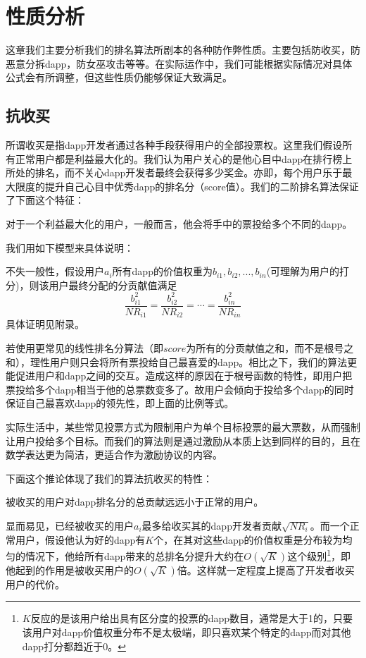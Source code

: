 \section{性质分析}
这章我们主要分析我们的排名算法所剧本的各种防作弊性质。主要包括防收买，防恶意分拆dapp，防女巫攻击等等。在实际运作中，我们可能根据实际情况对具体公式会有所调整，但这些性质仍能够保证大致满足。

\subsection{抗收买}
所谓收买是指dapp开发者通过各种手段获得用户的全部投票权。这里我们假设所有正常用户都是利益最大化的。我们认为用户关心的是他心目中dapp在排行榜上所处的排名，而不关心dapp开发者最终会获得多少奖金。亦即，每个用户乐于最大限度的提升自己心目中优秀dapp的排名分（score值）。我们的二阶排名算法保证了下面这个特征：

\begin{property}
	\label{p1}
	对于一个利益最大化的用户，一般而言，他会将手中的票投给多个不同的dapp。
\end{property}
我们用如下模型来具体说明：

不失一般性，假设用户$a_i$所有dapp的价值权重为$b_{i1},b_{i2},...,b_{in}$(可理解为用户的打分)，则该用户最终分配的分贡献值满足
$$\frac{b_{i1}^2}{NR_{i1}}=\frac{b_{i2}^2}{NR_{i2}}=\cdots=\frac{b_{in}^2}{NR_{in}}$$
具体证明见附录。

若使用更常见的线性排名分算法（即$score$为所有的分贡献值之和，而不是根号之和），理性用户则只会将所有票投给自己最喜爱的dapp。相比之下，我们的算法更能促进用户和dapp之间的交互。造成这样的原因在于根号函数的特性，即用户把票投给多个dapp相当于他的总票数变多了。故用户会倾向于投给多个dapp的同时保证自己最喜欢dapp的领先性，即上面的比例等式。

实际生活中，某些常见投票方式为限制用户为单个目标投票的最大票数，从而强制让用户投给多个目标。而我们的算法则是通过激励从本质上达到同样的目的，且在数学表达更为简洁，更适合作为激励协议的内容。

下面这个推论体现了我们的算法抗收买的特性：
\begin{corollary}
被收买的用户对dapp排名分的总贡献远远小于正常的用户。
\end{corollary}
显而易见，已经被收买的用户$a_i$最多给收买其的dapp开发者贡献$\sqrt{NR_i}$。而一个正常用户，假设他认为好的dapp有$K$个，在其对这些dapp的价值权重是分布较为均匀的情况下，他给所有dapp带来的总排名分提升大约在$O(\sqrt{K})$这个级别\footnote{$K$反应的是该用户给出具有区分度的投票的dapp数目，通常是大于1的，只要该用户对dapp价值权重分布不是太极端，即只喜欢某个特定的dapp而对其他dapp打分都趋近于0。}，即他起到的作用是被收买用户的$O(\sqrt{K})$倍。这样就一定程度上提高了开发者收买用户的代价。

